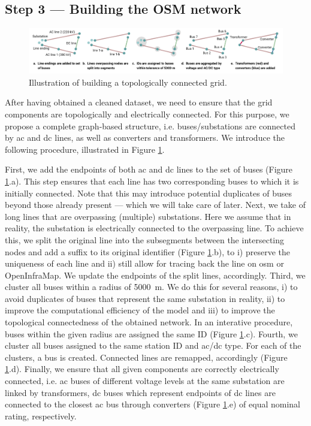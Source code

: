 \documentclass[fleqn,10pt]{wlscirep}
\let\autocite\cite
\begin{document}
\subsection*{Step 3 --- Building the OSM network}
\begin{figure}[!htbp]
    \centering
    \includegraphics[width=\linewidth]{figures/fig_build_osm_network.pdf}
    \caption{Illustration of building a topologically connected grid.}
    \label{fig:build_osm_network}
\end{figure}

After having obtained a cleaned dataset, we need to ensure that the grid components are topologically and electrically connected. For this purpose, we propose a complete graph-based structure, i.e. buses/substations are connected by \acrshort{ac} and \acrshort{dc} lines, as well as converters and transformers. We introduce the following procedure, illustrated in Figure \ref{fig:build_osm_network}.

First, we add the endpoints of both \acrshort{ac} and \acrshort{dc} lines to the set of buses (Figure \ref{fig:build_osm_network}.a). This step ensures that each line has two corresponding buses to which it is initially connected. Note that this may introduce potential duplicates of buses beyond those already present --- which we will take care of later. Next, we take of long lines that are overpassing (multiple) substations. Here we assume that in reality, the substation is electrically connected to the overpassing line. To achieve this, we split the original line into the subsegments between the intersecting nodes and add a suffix to its original identifier (Figure \ref{fig:build_osm_network}.b), to i) preserve the uniqueness of each line and ii) still allow for tracing back the line on \acrshort{osm} or OpenInfraMap.\autocite{garrettOpenInfrastructureMap2024} We update the endpoints of the split lines, accordingly. Third, we cluster all buses within a radius of \SI{5000}{\meter}. We do this for several reasons, i) to avoid duplicates of buses that represent the same substation in reality, ii) to improve the computational efficiency of the model and iii) to improve the topological connectedness of the obtained network. In an interative procedure, buses within the given radius are assigned the same ID (Figure \ref{fig:build_osm_network}.c). Fourth, we cluster all buses assigned to the same station ID and \acrshort{ac}/\acrshort{dc} type. For each of the clusters, a bus is created. Connected lines are remapped, accordingly (Figure \ref{fig:build_osm_network}.d). Finally, we ensure that all given components are correctly electrically connected, i.e. \acrshort{ac} buses of different voltage levels at the same substation are linked by transformers, \acrshort{dc} buses which represent endpoints of \acrshort{dc} lines are connected to the closest \acrshort{ac} bus through converters (Figure \ref{fig:build_osm_network}.e) of equal nominal rating, respectively.
\end{document}
